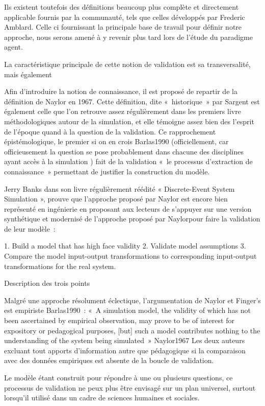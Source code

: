 Ils existent toutefois des définitions beaucoup plus complète et directement applicable fournis par la communauté, tels que celles développés par Frederic Amblard. Celle ci fournissant la principale base de travail pour définir notre approche, nous serons amené à y revenir plus tard lors de l'étude du paradigme agent.

La caractéristique principale de cette notion de validation est sa transversalité, mais également  

Afin d'introduire la notion de connaissance, il est proposé de repartir de la définition de Naylor en 1967. Cette définition, dite  « historique » par Sargent est également celle que l'on retrouve assez régulièrement dans les premiers livre méthodologiques autour de la simulation, et elle témoigne assez bien des l'esprit de l'époque quand à la question de la validation. 
Ce rapprochement épistémologique, le premier si on en crois {Barlas1990} (officiellement, car officieusement la question se pose probablement dans chacune des disciplines ayant accès à la simulation ) fait de la validation « le processus d'extraction de connaissance » permettant de justifier la construction du modèle. 

Jerry Banks dans son livre régulièrement réédité « Discrete-Event System Simulation », prouve que l'approche proposé par Naylor est encore bien représenté en ingénierie en proposant aux lecteurs de s'appuyer sur une version synthétique et modernisé de l'approche proposé par Naylorpour faire la validation de leur modèle : 

1. Build a model that has high face validity
2. Validate model assumptions
3. Compare the model input-output transformations to corresponding input-output transformations for the real system.

{Description des trois points}

Malgré une approche résolument éclectique, l'argumentation de Naylor et Finger's est  empiriste {Barlas1990} : « A simulation model, the validity of which has not been ascertained by empirical observation, may prove to be of interest for expository or pedagogical purposes, [but] such a model contributes  nothing to the understanding of the system being simulated » {Naylor1967} Les deux auteurs excluant tout apports d'information autre que pédagogique si la comparaison avec des données empiriques est absente de la boucle de validation.

Le modèle étant construit pour répondre à une ou plusieurs questions, ce processus de validation ne peux plus être envisagé sur un plan universel, surtout lorsqu'il utilisé dans un cadre de sciences humaines et sociales. 

